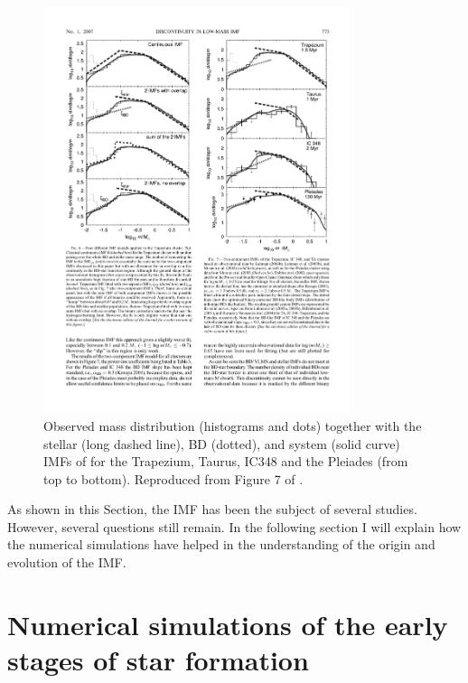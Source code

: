  \begin{figure}[htbp]
\begin{center}
\includegraphics[width=0.8\textwidth]{background/Figures/F7_Thies2007.pdf}
\caption{Observed mass distribution (histograms and dots) together with the stellar (long dashed line), BD (dotted), and system (solid curve) IMFs of \citet{Thies2007} for the Trapezium, Taurus, IC348 and the Pleiades (from top to bottom). Reproduced from Figure 7 of \citet{Thies2007}.}
\label{fig:IMFThies2007}
\end{center}
\end{figure}
 
As shown in this Section, the IMF has been the subject of several studies. However, several questions still remain. In the following section I will explain how the numerical simulations have helped in the understanding of the origin and evolution of the IMF.


\section{Numerical simulations of the early stages of star formation}
\label{sect:numerical_simulations}

